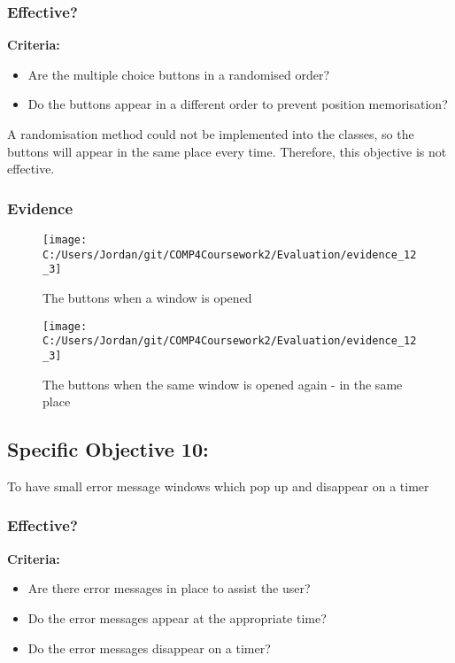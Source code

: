 \subsubsection{Effective?}

\textbf{Criteria: }

\begin{itemize}
	\item Are the multiple choice buttons in a randomised order?
	\item Do the buttons appear in a different order to prevent position memorisation?
\end{itemize}

A randomisation method could not be implemented into the classes, so the buttons will appear in the same place every time. Therefore, this objective is not effective.

\subsubsection{Evidence}

\begin{figure}[H]
	\texttt{[image: C:/Users/Jordan/git/COMP4Coursework2/Evaluation/evidence\_12\_3]}
	\caption{The buttons when a window is opened}
\end{figure}

\begin{figure}[H]
	\texttt{[image: C:/Users/Jordan/git/COMP4Coursework2/Evaluation/evidence\_12\_3]}
	\caption{The buttons when the same window is opened again - in the same place}
\end{figure}

\subsection{Specific Objective 10: }

To have small error message windows which pop up and disappear on a timer

\subsubsection{Effective?}

\textbf{Criteria: }

\begin{itemize}
	\item Are there error messages in place to assist the user?
	\item Do the error messages appear at the appropriate time?
	\item Do the error messages disappear on a timer?
\end{itemize}

